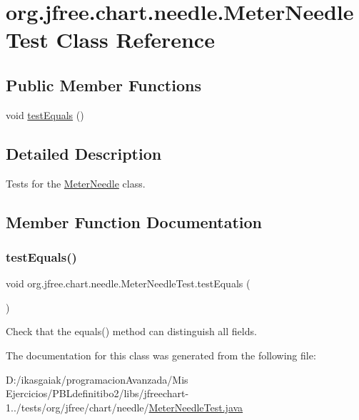 \hypertarget{classorg_1_1jfree_1_1chart_1_1needle_1_1_meter_needle_test}{}\section{org.\+jfree.\+chart.\+needle.\+Meter\+Needle\+Test Class Reference}
\label{classorg_1_1jfree_1_1chart_1_1needle_1_1_meter_needle_test}
\subsection*{Public Member Functions}
\begin{DoxyCompactItemize}
\item 
void \mbox{\hyperlink{classorg_1_1jfree_1_1chart_1_1needle_1_1_meter_needle_test_a580f30b4d3d4368f4f8312a97c56eb11}{test\+Equals}} ()
\end{DoxyCompactItemize}


\subsection{Detailed Description}
Tests for the \mbox{\hyperlink{classorg_1_1jfree_1_1chart_1_1needle_1_1_meter_needle}{Meter\+Needle}} class. 

\subsection{Member Function Documentation}
\mbox{\label{classorg_1_1jfree_1_1chart_1_1needle_1_1_meter_needle_test_a580f30b4d3d4368f4f8312a97c56eb11}} 
\subsubsection{\texorpdfstring{test\+Equals()}{testEquals()}}
{\footnotesize\ttfamily void org.\+jfree.\+chart.\+needle.\+Meter\+Needle\+Test.\+test\+Equals (\begin{DoxyParamCaption}{ }\end{DoxyParamCaption})}

Check that the equals() method can distinguish all fields. 

The documentation for this class was generated from the following file\+:\begin{DoxyCompactItemize}
\item 
D\+:/ikasgaiak/programacion\+Avanzada/\+Mis Ejercicios/\+P\+B\+Ldefinitibo2/libs/jfreechart-\/1../tests/org/jfree/chart/needle/\mbox{\hyperlink{_meter_needle_test_8java}{Meter\+Needle\+Test.\+java}}\end{DoxyCompactItemize}
